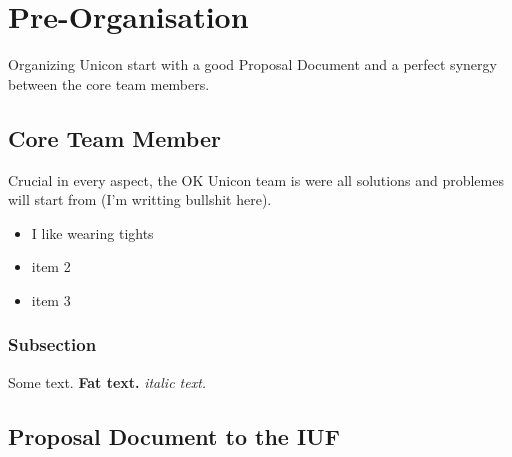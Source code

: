 \chapter{Pre-Organisation}
Organizing Unicon start with a good Proposal Document and a perfect synergy between the core team members.

\section{Core Team Member}
Crucial in every aspect, the OK Unicon team is were all solutions and problemes will start from (I'm writting bullshit here).

\begin{itemize}
    \item I like wearing tights
    \item item 2
    \item item 3
\end{itemize}

\subsection{Subsection}
Some text. \textbf{Fat text.} \textit{italic text.}

\section{Proposal Document to the IUF}
